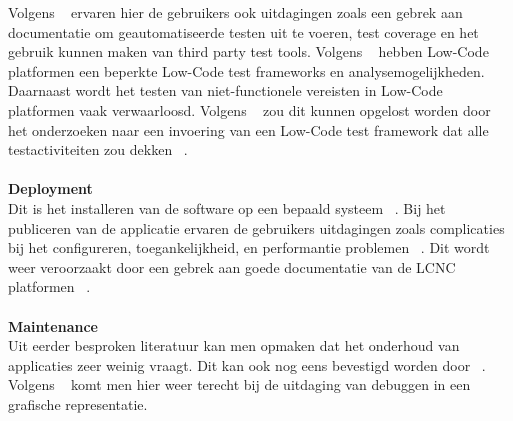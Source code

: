 Volgens ~\textcite{Rokis_2022} ervaren hier de gebruikers ook uitdagingen zoals een gebrek aan documentatie om geautomatiseerde testen uit te voeren, 
test coverage en het gebruik kunnen maken van third party test tools. 
Volgens ~\textcite{Rokis_2022} hebben Low-Code platformen een beperkte Low-Code test frameworks en analysemogelijkheden. 
Daarnaast wordt het testen van niet-functionele vereisten in Low-Code platformen vaak verwaarloosd. 
Volgens ~\textcite{Rokis_2022} zou dit kunnen opgelost worden door het onderzoeken naar een invoering van een Low-Code test framework dat alle testactiviteiten zou dekken ~\autocite{Rokis_2022}.
\\
\\
\textbf{Deployment}
\\
Dit is het installeren van de software op een bepaald systeem ~\autocite{Ghumatkar_2023}.
Bij het publiceren van de applicatie ervaren de gebruikers uitdagingen zoals complicaties bij het configureren, toegankelijkheid, en performantie problemen ~\autocite{Rokis_2022}. 
Dit wordt weer veroorzaakt door een gebrek aan goede documentatie van de LCNC platformen ~\autocite{Rokis_2022}.
\\
\\
\textbf{Maintenance}
\\
Uit eerder besproken literatuur kan men opmaken dat het onderhoud van applicaties zeer weinig vraagt. Dit kan ook nog eens bevestigd worden door ~\textcite{Rokis_2022}.
Volgens ~\textcite{Rokis_2022} komt men hier weer terecht bij de uitdaging van debuggen in een grafische representatie.


